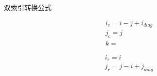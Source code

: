 {双索引转换公式}

\begin{equation}
\begin{aligned}
&i_c = i-j + i_{diag}\\
&j_c = j\\
&k = 
\end{aligned}
\end{equation}

\begin{equation}
\begin{aligned}
&i_r = i\\
&j_r = j-i + j_{diag}
\end{aligned}
\end{equation}



